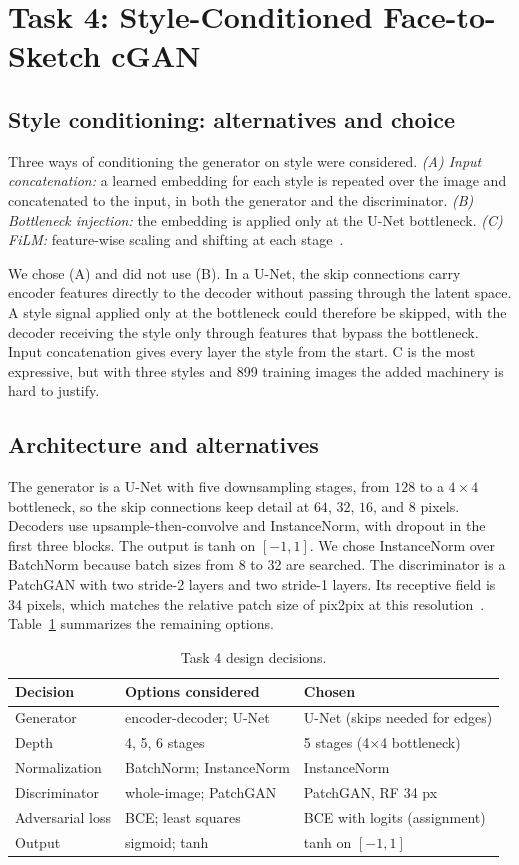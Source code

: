 \documentclass[conference]{IEEEtran}
\begin{document}
\section{Task 4: Style-Conditioned Face-to-Sketch cGAN}
\subsection{Style conditioning: alternatives and choice}
Three ways of conditioning the generator on style were considered. \emph{(A) Input concatenation:} a
learned embedding for each style is repeated over the image and concatenated to the input, in both the
generator and the discriminator. \emph{(B) Bottleneck injection:} the embedding is applied only at the
U-Net bottleneck. \emph{(C) FiLM:} feature-wise scaling and shifting at each stage~\cite{perez2018film}.

We chose (A) and did not use (B). In a U-Net, the skip connections carry encoder features directly to the
decoder without passing through the latent space. A style signal applied only at the bottleneck could
therefore be skipped, with the decoder receiving the style only through features that bypass the bottleneck.
Input concatenation gives every layer the style from the start. C is the most expressive, but with three
styles and 899 training images the added machinery is hard to justify.

\subsection{Architecture and alternatives}
The generator is a U-Net with five downsampling stages, from $128$ to a $4\times4$ bottleneck, so the
skip connections keep detail at $64$, $32$, $16$, and $8$ pixels. Decoders use upsample-then-convolve
and InstanceNorm, with dropout in the first three blocks. The output is tanh on $[-1,1]$. We chose
InstanceNorm over BatchNorm because batch sizes from 8 to 32 are searched. The discriminator is a
PatchGAN with two stride-2 layers and two stride-1 layers. Its receptive field is 34 pixels, which
matches the relative patch size of pix2pix at this resolution~\cite{isola2017pix2pix}. Table~\ref{tab:t4choices}
summarizes the remaining options.

\begin{table}[t]
\centering
\caption{Task 4 design decisions.}
\label{tab:t4choices}
\begin{tabular}{@{}p{2.2cm}p{2.9cm}p{2.6cm}@{}}
\toprule
Decision & Options considered & Chosen \\
\midrule
Generator & encoder-decoder; U-Net & U-Net (skips needed for edges) \\
Depth & 4, 5, 6 stages & 5 stages (4$\times$4 bottleneck) \\
Normalization & BatchNorm; InstanceNorm & InstanceNorm \\
Discriminator & whole-image; PatchGAN & PatchGAN, RF 34 px \\
Adversarial loss & BCE; least squares & BCE with logits (assignment) \\
Output & sigmoid; tanh & tanh on $[-1,1]$ \\
\bottomrule
\end{tabular}
\end{table}
\end{document}

